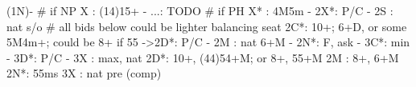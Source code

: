 (1N)-
# if NP
X  : (14)15+
   - ...: TODO
# if PH
X* : 4M5m
   - 2X*: P/C
   - 2S : nat s/o
# all bids below could be lighter balancing seat
2C*: 10+; 6+D, or some 5M4m+; could be 8+ if 55
   ->2D*: P/C
   - 2M : nat 6+M
   - 2N*: F, ask
        - 3C*: min
             - 3D*: P/C
        - 3X : max, nat
2D*: 10+, (44)54+M; or 8+, 55+M
2M : 8+, 6+M
2N*: 55ms
3X : nat pre (comp)

